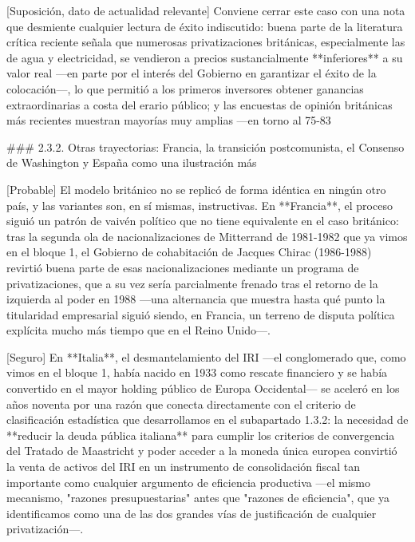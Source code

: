 \documentclass[10pt,a4paper]{article}
\begin{document}
[Suposición, dato de actualidad relevante] Conviene cerrar este caso con una nota que desmiente cualquier lectura de éxito indiscutido: buena parte de la literatura crítica reciente señala que numerosas privatizaciones británicas, especialmente las de agua y electricidad, se vendieron a precios sustancialmente **inferiores** a su valor real —en parte por el interés del Gobierno en garantizar el éxito de la colocación—, lo que permitió a los primeros inversores obtener ganancias extraordinarias a costa del erario público; y las encuestas de opinión británicas más recientes muestran mayorías muy amplias —en torno al 75-83%

### 2.3.2. Otras trayectorias: Francia, la transición postcomunista, el Consenso de Washington y España como una ilustración más

[Probable] El modelo británico no se replicó de forma idéntica en ningún otro país, y las variantes son, en sí mismas, instructivas. En **Francia**, el proceso siguió un patrón de vaivén político que no tiene equivalente en el caso británico: tras la segunda ola de nacionalizaciones de Mitterrand de 1981-1982 que ya vimos en el bloque 1, el Gobierno de cohabitación de Jacques Chirac (1986-1988) revirtió buena parte de esas nacionalizaciones mediante un programa de privatizaciones, que a su vez sería parcialmente frenado tras el retorno de la izquierda al poder en 1988 —una alternancia que muestra hasta qué punto la titularidad empresarial siguió siendo, en Francia, un terreno de disputa política explícita mucho más tiempo que en el Reino Unido—.

[Seguro] En **Italia**, el desmantelamiento del IRI —el conglomerado que, como vimos en el bloque 1, había nacido en 1933 como rescate financiero y se había convertido en el mayor holding público de Europa Occidental— se aceleró en los años noventa por una razón que conecta directamente con el criterio de clasificación estadística que desarrollamos en el subapartado 1.3.2: la necesidad de **reducir la deuda pública italiana** para cumplir los criterios de convergencia del Tratado de Maastricht y poder acceder a la moneda única europea convirtió la venta de activos del IRI en un instrumento de consolidación fiscal tan importante como cualquier argumento de eficiencia productiva —el mismo mecanismo, "razones presupuestarias" antes que "razones de eficiencia", que ya identificamos como una de las dos grandes vías de justificación de cualquier privatización—.
\end{document}
